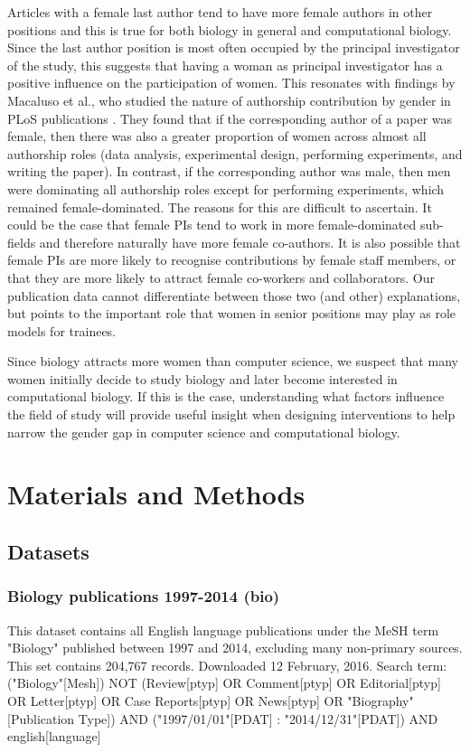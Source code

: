 \documentclass[10pt,letterpaper]{article}
\begin{document}
\begin{flushleft}
Articles with a female last author tend to have more female authors in other positions and this is true for both biology in general and computational biology.  Since the last author position is most often occupied by the principal investigator of the study, this suggests that having a woman as principal investigator has a positive influence on the participation of women. This resonates with findings by Macaluso et al., who studied the nature of authorship contribution by gender in PLoS publications \cite{Macaluso2016}. They found that if the corresponding author of a paper was female, then there was also a greater proportion of women across almost all authorship roles (data analysis, experimental design, performing experiments, and writing the paper). In contrast, if the corresponding author was male, then men were dominating all authorship roles except for performing experiments, which remained female-dominated. The reasons for this are difficult to ascertain. It could be the case that female PIs tend to work in more female-dominated sub-fields and therefore naturally have more female co-authors. It is also possible that female PIs are more likely to recognise contributions by female staff members, or that they are more likely to attract female co-workers and collaborators. Our publication data cannot differentiate between those two (and other) explanations, but points to the important role that women in senior positions may play as role models for trainees.

Since biology attracts more women than computer science, we suspect that many women initially decide to study biology and later become interested in computational biology. If this is the case, understanding what factors influence the field of study will provide useful insight when designing interventions to help narrow the gender gap in computer science and computational biology.

\section*{Materials and Methods}

\subsection*{Datasets}

\subsubsection*{Biology publications 1997-2014 (bio)}
This dataset \cite{Bonham2016} contains all English language publications under the MeSH term "Biology" published between 1997 and 2014, excluding many non-primary sources. This set contains 204,767 records. Downloaded 12 February, 2016. Search term: ("Biology"[Mesh]) NOT (Review[ptyp] OR Comment[ptyp] OR Editorial[ptyp] OR Letter[ptyp] OR Case Reports[ptyp] OR News[ptyp] OR "Biography" [Publication Type]) AND ("1997/01/01"[PDAT] : "2014/12/31"[PDAT]) AND english[language]


\end{flushleft}
\end{document}
